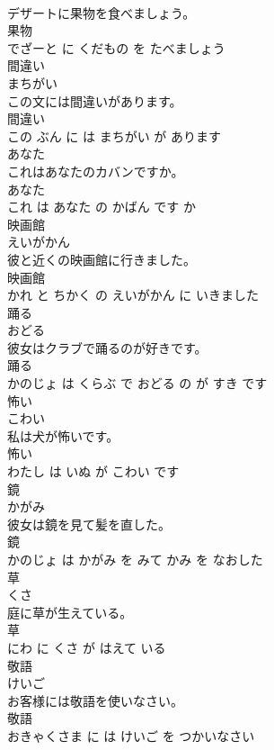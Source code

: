 \documentclass[8pt]{extreport}
\begin{document}
\begin{CJK}{UTF8}{min}
\\	デザートに果物を食べましょう。	
\\	果物 
\\	でざーと に くだもの を たべましょう			
\\	間違い	
\\	まちがい			
\\	この文には間違いがあります。	
\\	間違い 
\\	この ぶん に は まちがい が あります			
\\	あなた	
\\	これはあなたのカバンですか。	
\\	あなた 
\\	これ は あなた の かばん です か			
\\	映画館	
\\	えいがかん			
\\	彼と近くの映画館に行きました。	
\\	映画館 
\\	かれ と ちかく の えいがかん に いきました			
\\	踊る	
\\	おどる			
\\	彼女はクラブで踊るのが好きです。	
\\	踊る 
\\	かのじょ は くらぶ で おどる の が すき です			
\\	怖い	
\\	こわい			
\\	私は犬が怖いです。	
\\	怖い 
\\	わたし は いぬ が こわい です			
\\	鏡	
\\	かがみ			
\\	彼女は鏡を見て髪を直した。	
\\	鏡 
\\	かのじょ は かがみ を みて かみ を なおした			
\\	草	
\\	くさ			
\\	庭に草が生えている。	
\\	草 
\\	にわ に くさ が はえて いる			
\\	敬語	
\\	けいご			
\\	お客様には敬語を使いなさい。	
\\	敬語 
\\	おきゃくさま に は けいご を つかいなさい			

\end{CJK}
\end{document}
